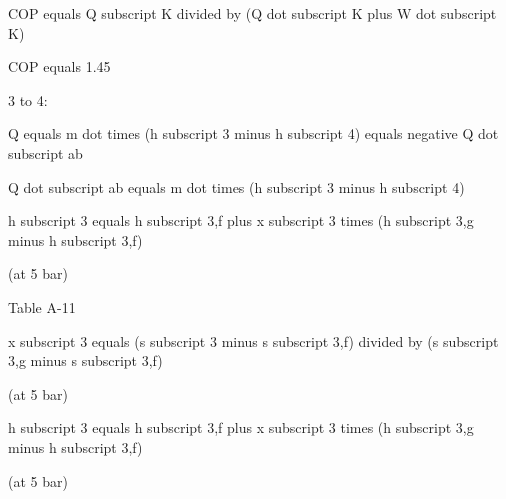 COP equals Q subscript K divided by (Q dot subscript K plus W dot subscript K)  

COP equals 1.45  

3 to 4:  

Q equals m dot times (h subscript 3 minus h subscript 4) equals negative Q dot subscript ab  

Q dot subscript ab equals m dot times (h subscript 3 minus h subscript 4)  

h subscript 3 equals h subscript 3,f plus x subscript 3 times (h subscript 3,g minus h subscript 3,f)  

(at 5 bar)  

Table A-11  

x subscript 3 equals (s subscript 3 minus s subscript 3,f) divided by (s subscript 3,g minus s subscript 3,f)  

(at 5 bar)  

h subscript 3 equals h subscript 3,f plus x subscript 3 times (h subscript 3,g minus h subscript 3,f)  

(at 5 bar)